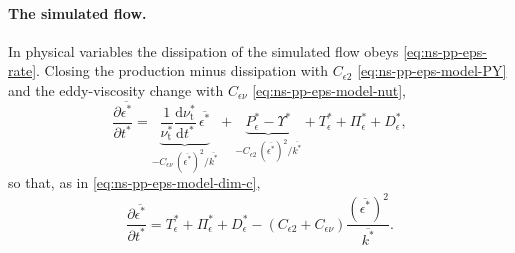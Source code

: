 \documentclass{article}
\begin{document}
\paragraph{The simulated flow.}
In physical variables the dissipation of the simulated flow obeys
\eqref{eq:ns-pp-eps-rate}. Closing the production minus dissipation with
$C_{\epsilon 2}$ \eqref{eq:ns-pp-eps-model-PY} and the eddy-viscosity change
with $C_{\epsilon\nu}$ \eqref{eq:ns-pp-eps-model-nut},
\begin{equation*}
  \frac{\partial \overline{\epsilon^*}}{\partial t^*}
  = \underbrace{\frac{1}{\nu_{\mathrm{t}}^*}\frac{\mathrm{d}\nu_{\mathrm{t}}^*}{\mathrm{d}t^*}\, \overline{\epsilon^*}}_{-C_{\epsilon\nu}\, (\overline{\epsilon^*})^2/\overline{k^*}}
  + \underbrace{P_\epsilon^* - \Upsilon^*}_{-C_{\epsilon 2}\, (\overline{\epsilon^*})^2/\overline{k^*}}
  + T_\epsilon^* + \Pi_\epsilon^* + D_\epsilon^* ,
\end{equation*}
so that, as in \eqref{eq:ns-pp-eps-model-dim-c},
\begin{equation}\label{eq:puff-eps-sim-dim}
  \frac{\partial \overline{\epsilon^*}}{\partial t^*}
  = T_\epsilon^* + \Pi_\epsilon^* + D_\epsilon^*
  - \left( C_{\epsilon 2} + C_{\epsilon\nu} \right) \frac{\left(\overline{\epsilon^*}\right)^2}{\overline{k^*}} .
\end{equation}
\end{document}
